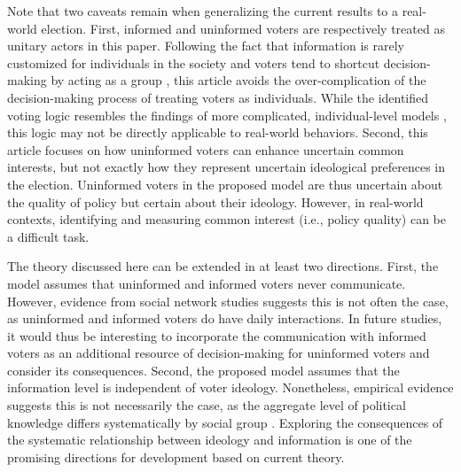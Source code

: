 \documentclass[letterpaper, 12pt]{article}
\begin{document}
    \par Note that two caveats remain when generalizing the current results to a real-world election. First, informed and uninformed voters are respectively treated as unitary actors in this paper. Following the fact that information is rarely customized for individuals in the society and voters tend to shortcut decision-making by acting as a group \citep{Tajfel1979anin, Druckman1994napa, Huddy2002frso, Iyengar2012afno}, this article avoids the over-complication of the decision-making process of treating voters as individuals. While the identified voting logic resembles the findings of more complicated, individual-level models \citep[e.g.,][]{Feddersen1996thsw}, this logic may not be directly applicable to real-world behaviors. Second, this article focuses on how uninformed voters can enhance uncertain common interests, but not exactly how they represent uncertain ideological preferences in the election. Uninformed voters in the proposed model are thus uncertain about the quality of policy but certain about their ideology. However, in real-world contexts, identifying and measuring common interest (i.e., policy quality) can be a difficult task.

    \par The theory discussed here can be extended in at least two directions. First, the model assumes that uninformed and informed voters never communicate. However, evidence from social network studies \citep{Huckfeldt2001thso} suggests this is not often the case, as uninformed and informed voters do have daily interactions. In future studies, it would thus be interesting to incorporate the communication with informed voters as an additional resource of decision-making for uninformed voters and consider its consequences. Second, the proposed model assumes that the information level is independent of voter ideology. Nonetheless, empirical evidence suggests this is not necessarily the case, as the aggregate level of political knowledge differs systematically by social group \citep{Dellicarpini1996wham, Althaus2003copr}. Exploring the consequences of the systematic relationship between ideology and information is one of the promising directions for development based on current theory.
    
    \clearpage
    
    
%    
%    
    
    
    
    
\end{document}
